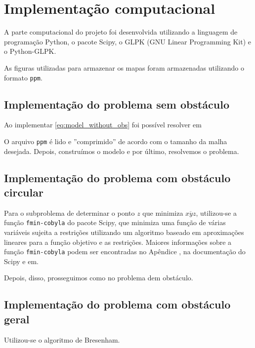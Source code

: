 %
%
%

\section{Implementa\c{c}\~{a}o computacional}
A parte computacional do projeto foi desenvolvida utilizando a linguagem de
programação Python\nocite{Python}, o pacote Scipy, o GLPK (GNU Linear
Programming Kit)\nocite{GLPK} e o Python-GLPK.

As figuras utilizadas para armazenar os mapas foram armazenadas
utilizando o formato \texttt{ppm}.

\subsection{Implementação do problema sem obstáculo}
Ao implementar \eqref{eq:model_without_obs} foi possível resolver em

O arquivo \texttt{ppm} é lido e ''comprimido'' de acordo com o tamanho da malha
desejada. Depois, construímos o modelo e por último, resolvemos o problema.

\subsection{Implementação do problema com obstáculo circular}
Para o subproblema de determinar o ponto $z$ que minimiza $\overline{xyz}$,
utilizou-se a função \texttt{fmin-cobyla} do pacote Scipy, que minimiza uma
função de várias variáveis sujeita a restrições utilizando um algoritmo baseado
em aproximações lineares para a função objetivo e as restrições. Maiores
informações sobre a função \texttt{fmin-cobyla} podem ser encontradas no
Apêndice , na documentação do Scipy e em.

Depois, disso, prosseguimos como no problema dem obstáculo.

\subsection{Implementação do problema com obstáculo geral}
Utilizou-se o algoritmo de Bresenham.

